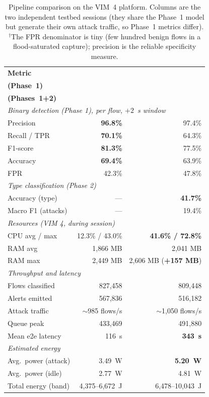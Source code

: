 \documentclass[conference]{IEEEtran}
\begin{document}
\begin{table}[t]
\centering
\caption{Pipeline comparison on the VIM~4 platform. Columns are the two
independent testbed sessions (they share the Phase~1 model but generate their own
attack traffic, so Phase~1 metrics differ). $^\dagger$The FPR denominator is tiny
(few hundred benign flows in a flood-saturated capture); precision is the reliable
specificity measure.}
\label{tab:comparison}
\setlength{\tabcolsep}{4pt}
\footnotesize
\begin{tabular}{@{}lrr@{}}
\toprule
\textbf{Metric} & \shortstack[r]{\textbf{Binary}\\ \textbf{(Phase~1)}}
                 & \shortstack[r]{\textbf{Multiclass}\\ \textbf{(Phases~1+2)}} \\ \midrule
\multicolumn{3}{l}{\textit{Binary detection (Phase 1), per flow, $+2$~s window}} \\
\quad Precision            & \textbf{96.8\%} & 97.4\% \\
\quad Recall / TPR         & \textbf{70.1\%} & 64.3\% \\
\quad F1-score             & \textbf{81.3\%} & 77.5\% \\
\quad Accuracy             & \textbf{69.4\%} & 63.9\% \\
\quad FPR\rlap{$^\dagger$} & 42.3\%         & 47.8\% \\ \midrule
\multicolumn{3}{l}{\textit{Type classification (Phase 2)}} \\
\quad Accuracy (type)   & —               & \textbf{41.7\%} \\
\quad Macro F1 (attacks) & —            & 19.4\% \\ \midrule
\multicolumn{3}{l}{\textit{Resources (VIM 4, during session)}} \\
\quad CPU avg / max     & 12.3\% / 43.0\% & \textbf{41.6\% / 72.8\%} \\
\quad RAM avg           & 1{,}866 MB      & 2{,}041 MB \\
\quad RAM max           & 2{,}449 MB      & 2{,}606 MB (\textbf{+157 MB}) \\ \midrule
\multicolumn{3}{l}{\textit{Throughput and latency}} \\
\quad Flows classified  & 827{,}458 & 809{,}448 \\
\quad Alerts emitted    & 567{,}836 & 516{,}182 \\
\quad Attack traffic    & $\sim$985 flows/s & $\sim$1{,}050 flows/s \\
\quad Queue peak        & 433{,}469 & 491{,}880 \\
\quad Mean e2e latency  & 116~s & \textbf{343~s} \\ \midrule
\multicolumn{3}{l}{\textit{Estimated energy}} \\
\quad Avg.\ power (attack) & 3.49~W & \textbf{5.20~W} \\
\quad Avg.\ power (idle)   & 2.77~W & 4.81~W \\
\quad Total energy (band)  & 4{,}375--6{,}672~J & 6{,}478--10{,}043~J \\
\bottomrule
\end{tabular}
\end{table}
\end{document}
